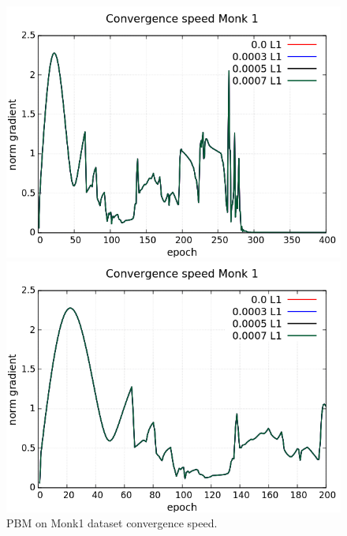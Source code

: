 \begin{figure}[H]
	\centering
	\begin{minipage}[t]{0.5\linewidth}
		\includegraphics[width=\linewidth]{data/PBM/Monk1/Monk1_PBM_L1_CS_standard.png}
	\end{minipage}%
	\begin{minipage}[t]{0.5\linewidth}
		\includegraphics[width=\linewidth]{data/PBM/Monk1/Monk1_PBM_L1_CS_zoom.png}
	\end{minipage}
	\caption{PBM on Monk1 dataset convergence speed.}
\end{figure}
